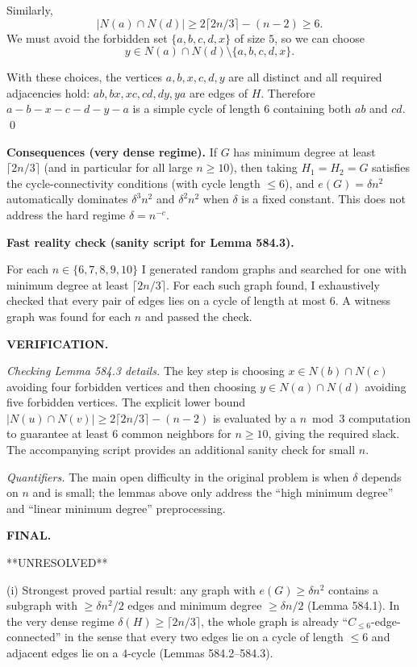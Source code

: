 Similarly,
\[
|N(a)\cap N(d)|\ge 2\lceil 2n/3\rceil-(n-2)\ge 6.
\]
We must avoid the forbidden set $\{a,b,c,d,x\}$ of size $5$, so we can choose
\[y\in N(a)\cap N(d)\setminus\{a,b,c,d,x\}.
\]

With these choices, the vertices $a,b,x,c,d,y$ are all distinct and all required adjacencies hold:
$ab, bx, xc, cd, dy, ya$ are edges of $H$.
Therefore $a-b-x-c-d-y-a$ is a simple cycle of length $6$ containing both $ab$ and $cd$.
\qed

\bigskip
\noindent\textbf{Consequences (very dense regime).}
If $G$ has minimum degree at least $\lceil 2n/3\rceil$ (and in particular for all large $n\ge 10$), then taking $H_1=H_2=G$ satisfies the cycle-connectivity conditions (with cycle length $\le 6$), and $e(G)=\delta n^2$ automatically dominates $\delta^3 n^2$ and $\delta^2 n^2$ when $\delta$ is a fixed constant.
This does not address the hard regime $\delta=n^{-c}$.

\bigskip
\noindent\textbf{Fast reality check (sanity script for Lemma 584.3).}

For each $n\in\{6,7,8,9,10\}$ I generated random graphs and searched for one with minimum degree at least $\lceil 2n/3\rceil$.
For each such graph found, I exhaustively checked that every pair of edges lies on a cycle of length at most $6$.
A witness graph was found for each $n$ and passed the check.

\bigskip
\noindent\textbf{VERIFICATION.}

\emph{Checking Lemma 584.3 details.}
The key step is choosing $x\in N(b)\cap N(c)$ avoiding four forbidden vertices and then choosing $y\in N(a)\cap N(d)$ avoiding five forbidden vertices.
The explicit lower bound $|N(u)\cap N(v)|\ge 2\lceil 2n/3\rceil-(n-2)$ is evaluated by a $n\bmod 3$ computation to guarantee at least $6$ common neighbors for $n\ge 10$, giving the required slack.
The accompanying script provides an additional sanity check for small $n$.

\emph{Quantifiers.}
The main open difficulty in the original problem is when $\delta$ depends on $n$ and is small; the lemmas above only address the ``high minimum degree'' and ``linear minimum degree'' preprocessing.

\bigskip
\noindent\textbf{FINAL.}

**UNRESOLVED**

(i) Strongest proved partial result: any graph with $e(G)\ge\delta n^2$ contains a subgraph with $\ge \delta n^2/2$ edges and minimum degree $\ge \delta n/2$ (Lemma 584.1). In the very dense regime $\delta(H)\ge\lceil 2n/3\rceil$, the whole graph is already ``$C_{\le 6}$-edge-connected'' in the sense that every two edges lie on a cycle of length $\le 6$ and adjacent edges lie on a $4$-cycle (Lemmas 584.2--584.3).

